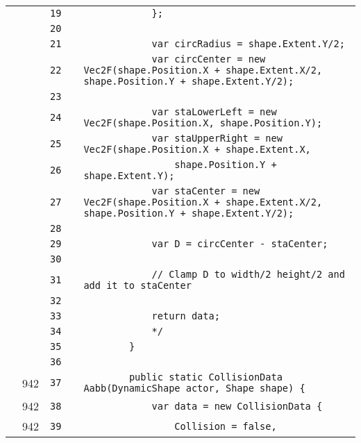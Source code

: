 \documentclass[a4paper,landscape,10pt]{article}
\begin{document}
\begin{longtable}[l]{lrrll}
\cellcolor{gray} &  & \verb~19~ & & \verb~            };~\\
\cellcolor{gray} &  & \verb~20~ & & \verb~~\\
\cellcolor{gray} &  & \verb~21~ & & \verb~            var circRadius = shape.Extent.Y/2;~\\
\cellcolor{gray} &  & \verb~22~ & & \verb~            var circCenter = new Vec2F(shape.Position.X + shape.Extent.X/2, shape.Position.Y + shape.Extent.Y/2);~\\
\cellcolor{gray} &  & \verb~23~ & & \verb~~\\
\cellcolor{gray} &  & \verb~24~ & & \verb~            var staLowerLeft = new Vec2F(shape.Position.X, shape.Position.Y);~\\
\cellcolor{gray} &  & \verb~25~ & & \verb~            var staUpperRight = new Vec2F(shape.Position.X + shape.Extent.X,~\\
\cellcolor{gray} &  & \verb~26~ & & \verb~                shape.Position.Y + shape.Extent.Y);~\\
\cellcolor{gray} &  & \verb~27~ & & \verb~            var staCenter = new Vec2F(shape.Position.X + shape.Extent.X/2, shape.Position.Y + shape.Extent.Y/2);~\\
\cellcolor{gray} &  & \verb~28~ & & \verb~~\\
\cellcolor{gray} &  & \verb~29~ & & \verb~            var D = circCenter - staCenter;~\\
\cellcolor{gray} &  & \verb~30~ & & \verb~~\\
\cellcolor{gray} &  & \verb~31~ & & \verb~            // Clamp D to width/2 height/2 and add it to staCenter~\\
\cellcolor{gray} &  & \verb~32~ & & \verb~~\\
\cellcolor{gray} &  & \verb~33~ & & \verb~            return data;~\\
\cellcolor{gray} &  & \verb~34~ & & \verb~            */~\\
\cellcolor{gray} &  & \verb~35~ & & \verb~        }~\\
\cellcolor{gray} &  & \verb~36~ & & \verb~~\\
\cellcolor{green} & 942 & \verb~37~ & & \verb~        public static CollisionData Aabb(DynamicShape actor, Shape shape) {~\\
\cellcolor{green} & 942 & \verb~38~ & & \verb~            var data = new CollisionData {~\\
\cellcolor{green} & 942 & \verb~39~ & & \verb~                Collision = false,~\\

\end{longtable}
\end{document}
